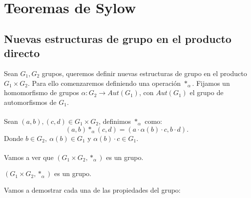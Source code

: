 
\chapter{Teoremas de Sylow}

\section{Nuevas estructuras de grupo en el producto directo}

Sean $G_1, G_2$ grupos, queremos definir nuevas estructuras de grupo en el producto $G_1 \times G_2$.
Para ello comenzaremos definiendo una operación $\ast_\alpha$. Fijamos un homomorfismo de grupos $\alpha:G_2 \longrightarrow Aut(G_1)$, con $Aut(G_1)$ el grupo de automorfismos de $G_1$.\\\\
Sean $(a,b),(c,d) \in G_1\times G_2$, definimos $\ast_\alpha$ como:
\[
(a,b)\ast_\alpha(c,d) = (a\cdot\alpha(b)\cdot c, b\cdot d).
\]
Donde $b\in G_2,\ \alpha(b) \in G_1$ y $\alpha(b)\cdot c \in G_1$.\\\\
Vamos a ver que $(G_1 \times G_2, \ast_\alpha)$ es un grupo.
\begin{thm}
	$(G_1 \times G_2, \ast_\alpha)$ es un grupo.
\end{thm}
Vamos a demostrar cada una de las propiedades del grupo:
